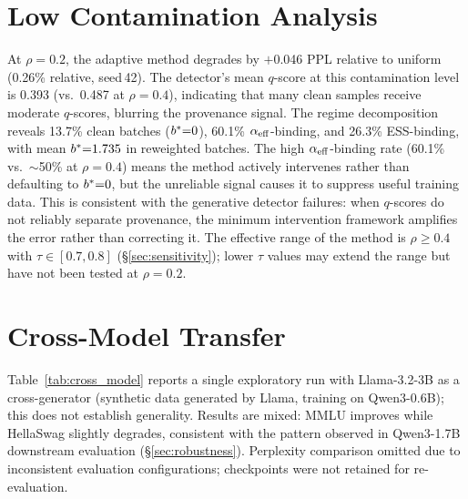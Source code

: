 \section{Low Contamination Analysis}
\label{app:rho02}

At $\rho{=}0.2$, the adaptive method degrades by $+$0.046 PPL relative to uniform (0.26\% relative, seed\,42).
The detector's mean $q$-score at this contamination level is 0.393 (vs.\ 0.487 at $\rho{=}0.4$), indicating that many clean samples receive moderate $q$-scores, blurring the provenance signal.
The regime decomposition reveals 13.7\% clean batches ($b^*{=}0$), 60.1\% $\alpha_{\mathrm{eff}}$-binding, and 26.3\% ESS-binding, with mean $b^*{=}1.735$ in reweighted batches.
The high $\alpha_{\mathrm{eff}}$-binding rate (60.1\% vs.\ ${\sim}$50\% at $\rho{=}0.4$) means the method actively intervenes rather than defaulting to $b^*{=}0$, but the unreliable signal causes it to suppress useful training data.
This is consistent with the generative detector failures: when $q$-scores do not reliably separate provenance, the minimum intervention framework amplifies the error rather than correcting it.
The effective range of the method is $\rho \geq 0.4$ with $\tau \in [0.7, 0.8]$ (\S\ref{sec:sensitivity}); lower $\tau$ values may extend the range but have not been tested at $\rho{=}0.2$.

\section{Cross-Model Transfer}
\label{app:cross_model}

Table~\ref{tab:cross_model} reports a single exploratory run with Llama-3.2-3B as a cross-generator (synthetic data generated by Llama, training on Qwen3-0.6B); this does not establish generality.
Results are mixed: MMLU improves while HellaSwag slightly degrades, consistent with the pattern observed in Qwen3-1.7B downstream evaluation (\S\ref{sec:robustness}).
Perplexity comparison omitted due to inconsistent evaluation configurations; checkpoints were not retained for re-evaluation.

\begin{table}[h]
\centering
\small
{}
\caption{Cross-model transfer: Llama-3.2-3B generator, Qwen3-0.6B trainer ($\rho{=}0.4$, single seed).
Mixed results reflect evaluation-set distribution sensitivity rather than consistent quality differences.}
\label{tab:cross_model}
\end{table}

